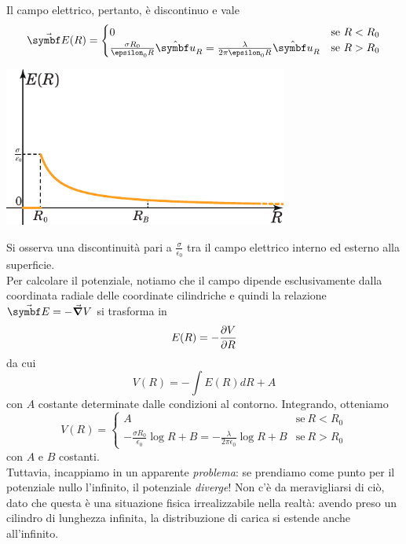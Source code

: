 Il campo elettrico, pertanto, è discontinuo e vale
\begin{equation}
	\vba{E}(R)=\begin{cases}
		0&\text{se}\ R< R_0\\
		\frac{\sigma R_0}{\epsilon_0 R}\vbh{u}_R=\frac{\lambda}{2\pi\epsilon_0 R}\vbh{u}_R &\text{se}\ R> R_0
	\end{cases}
\end{equation}
\begin{center}
	\includegraphics[width=0.7\textwidth]{images/chp3/chp3cilindrograf1.pdf}
\end{center}
Si osserva una discontinuità pari a $\frac{\sigma}{\epsilon_0}$ tra il campo elettrico interno ed esterno alla superficie.\\
Per calcolare il potenziale, notiamo che il campo dipende esclusivamente dalla coordinata radiale delle coordinate cilindriche e quindi la relazione $\vba{E}=-\grad{V}$ si trasforma in
\begin{equation*}
	E(R)=-\pdv{V}{R}
\end{equation*}
da cui
\begin{equation*}
	V(R)=-\int E(R)dR+A
\end{equation*}
con $A$ costante determinate dalle condizioni al contorno. Integrando, otteniamo
\begin{equation*}
	V(R)=
	\begin{cases}
		A&\text{se}\ R< R_0\\
		-\frac{\sigma R_0}{\epsilon_0}\log R + B=-\frac{\lambda}{2\pi\epsilon_0}\log R + B&\text{se}\ R> R_0
	\end{cases}
\end{equation*}
con $A$ e $B$ costanti.\\
Tuttavia, incappiamo in un apparente \textit{problema}: se prendiamo come punto per il potenziale nullo l'infinito, il potenziale \textit{diverge}! Non c'è da meravigliarsi di ciò, dato che questa è una situazione fisica irrealizzabile nella realtà: avendo preso un cilindro di lunghezza infinita, la distribuzione di carica si estende anche all'infinito.\\
